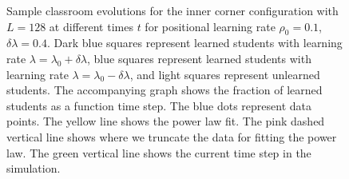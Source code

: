 \begin{figure}[htbp!]
   \caption{Sample classroom evolutions for the inner corner configuration with $L=128$ at different times $t$ for positional learning rate $\rho_0=0.1$, $\delta\lambda = 0.4$.
   Dark blue squares represent learned students with learning rate $\lambda = \lambda_0 + \delta\lambda$, blue squares represent learned students with learning rate $\lambda = \lambda_0 - \delta\lambda$, and light squares represent unlearned students.
   The accompanying graph shows the fraction of learned students as a function time step.
   The blue dots represent data points. 
   The yellow line shows the power law fit.
   The pink dashed vertical line shows where we truncate the data for fitting the power law.
   The green vertical line shows the current time step in the simulation.
   }
   \label{fig:2DBPCAIH sample class evolution low rho}
 \end{figure}

